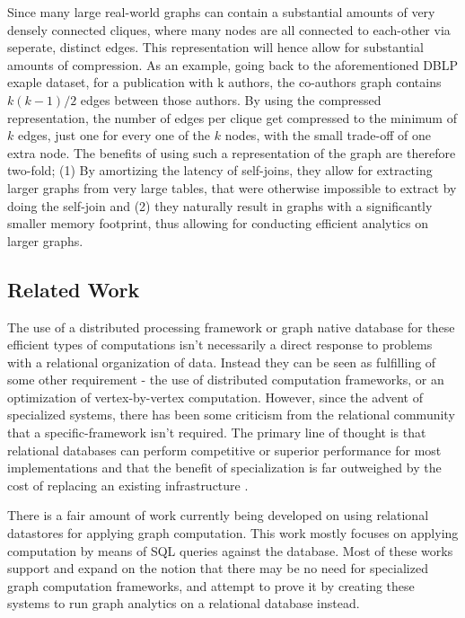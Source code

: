 \documentclass[11pt,letterpaper]{article}
\begin{document}
Since many large real-world graphs can contain a substantial amounts of very densely connected cliques, where many nodes are all connected to each-other via seperate, distinct edges. This representation will hence allow for substantial amounts of compression. As an example, going back to the aforementioned DBLP exaple dataset, for a publication with k authors, the co-authors graph contains $k(k-1)/2$ edges between those authors. By using the compressed representation, the number of edges per clique get compressed to the minimum of $k$ edges, just one for every one of the $k$ nodes, with the small trade-off of one extra node. The benefits of using such a representation of the graph are therefore two-fold; (1) By amortizing the latency of  self-joins, they allow for extracting larger graphs from very large tables, that were otherwise impossible to extract by doing the self-join and (2) they naturally result in graphs with a significantly smaller memory footprint, thus allowing for conducting efficient analytics on larger graphs.


\subsection*{Related Work}

The use of a distributed processing framework or graph native database for these efficient types of computations isn't necessarily a direct response to problems with a relational organization of data. Instead they can be seen as fulfilling of some other requirement - the use of distributed computation frameworks, or an optimization of vertex-by-vertex computation. However, since the advent of specialized systems, there has been some criticism from the relational community that a specific-framework isn't required. The primary line of thought is that relational databases can perform competitive or superior performance for most implementations and that the benefit of specialization is far outweighed by the cost of replacing an existing infrastructure \cite{welc_graph_2013}.

There is a fair amount of work currently being developed on using relational datastores for applying graph computation. This work mostly focuses on applying computation by means of SQL queries against the database. Most of these works support and expand on the notion that there may be no need for specialized graph computation frameworks, and attempt to prove it by creating these systems to run graph analytics on a relational database instead.
\end{document}
